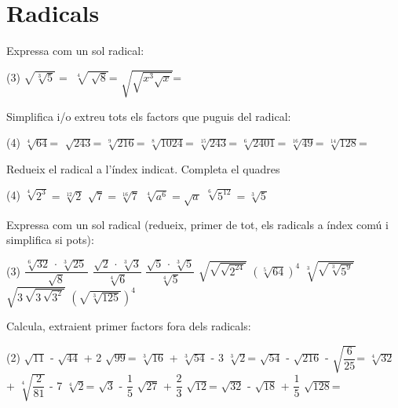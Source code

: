 \documentclass[11pt, a4paper, pdf]{article}
\let\frac\dfrac
\begin{document}
\section{Radicals}
	\begin{mylist}
		\item   Expressa com un sol radical:
		\begin{tasks}(3)
			\task $\sqrt{\sqrt[{3}]{5} } =$          
			\task $\sqrt[{4}]{\sqrt[{}]{8} } $=                   
			\task $\sqrt{\sqrt{x^{3} \sqrt{x} } } $=
		\end{tasks}
		
		\item  Simplifica i/o extreu tots els factors que puguis del radical:
		\begin{tasks}(4)
			\task  $\sqrt[{4}]{64} $=      
			\task  $\sqrt[{}]{243} $=          
			\task  $\sqrt[{9}]{216} $=      
			\task  $\sqrt[{8}]{1024} $=
			\task  $\sqrt[{15}]{243} $=   
			\task  $\sqrt[{6}]{2401} $= 
			\task  $\sqrt[{16}]{49} $=      
			\task  $\sqrt[{14}]{128} $=
		\end{tasks}
		
		\item  Redueix el radical a l'\'{i}ndex indicat. Completa el quadres 
		\begin{tasks}(4)
			\task $\sqrt[{4}]{2^{3} } =\sqrt[{12}]{2^{\boxed{ } } } $    
			\task $\sqrt{7} =\sqrt[{16}]{7^{\boxed{} } } $    
			\task $\sqrt[{4}]{a^{6} } =\sqrt{a^{\boxed{} } } $     
			\task $\sqrt[{6}]{5^{12} } =\sqrt[{3}]{5^{\boxed{} } } $
		\end{tasks}
		
		\item  Expressa com un sol radical (redueix, primer de tot, els radicals a \'{i}ndex com\'{u} i simplifica si pots):  
		\begin{tasks}(3)
			\task $\dfrac{\sqrt[{6}]{32} \, \cdot \, \sqrt[{3}]{25} \, }{\sqrt{8} } $   
			\task $\dfrac{\sqrt{2} \, \cdot \, \sqrt[{3}]{3} }{\sqrt[{4}]{6} } $   
			\task $\dfrac{\sqrt{5} \, \cdot \, \sqrt[{3}]{5} }{\sqrt[{4}]{5} } $     
			\task $\sqrt{\sqrt{\sqrt{2^{24} } } } $
			\task $\left(\sqrt[{5}]{64} \right)^{4} $   
			\task $\sqrt[{3}]{\sqrt{\sqrt[{3}]{5^{9} } } } $   
			\task $\sqrt{3\, \sqrt{3\, \sqrt{3^{2} } } } $    
			\task $\left(\sqrt{\sqrt[{3}]{125} } \right)^{4} $
		\end{tasks}
	 
		\item  Calcula, extraient primer factors fora dels radicals:
		\begin{tasks}(2)
			\task $\sqrt{11} $ - $\sqrt{44} $ + 2 $\sqrt{99} $=  
			\task $\sqrt[{3}]{16} $ + $\sqrt[{3}]{54} $ - 3 $\sqrt[{3}]{2} $= 
			 $\sqrt{54} $ - $\sqrt{216} $ - $\sqrt{\frac{6}{25} } $= 
			\task $\sqrt[{4}]{32} $ + $\sqrt[{4}]{\frac{2}{81} } $ - 7 $\sqrt[{4}]{2} $=
			 $\sqrt{3} $ - $\frac{1}{5} $ $\sqrt{27} $ + $\frac{2}{3} $ $\sqrt{12} $= 
			\task $\sqrt{32} $ - $\sqrt{18} $ + $\frac{1}{5} $ $\sqrt{128} $=
		\end{tasks}
 

\end{mylist}
\end{document}
